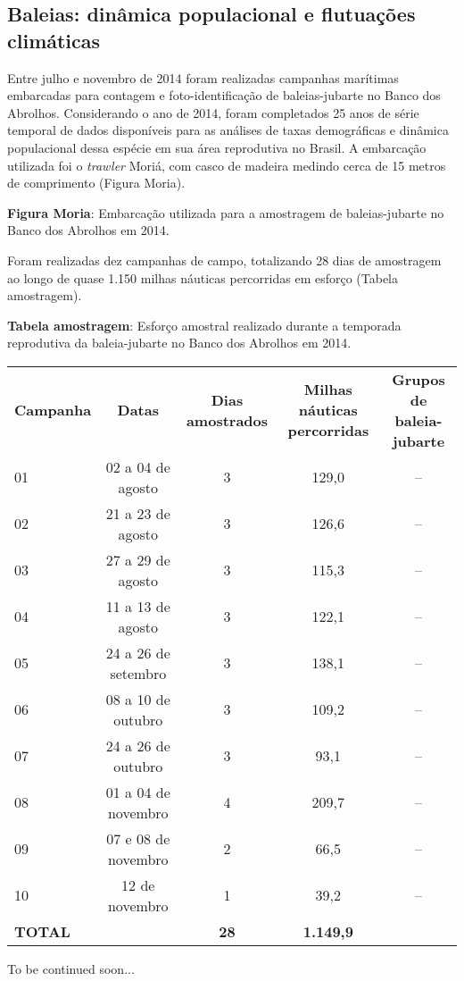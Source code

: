 \subsection{Baleias: dinâmica populacional e flutuações climáticas} %
\label{sec:dinam-popul-de} 

Entre julho e novembro de 2014 foram realizadas campanhas marítimas embarcadas para contagem e foto-identificação de baleias-jubarte no Banco dos Abrolhos. Considerando o ano de 2014, foram completados 25 anos de série temporal de dados disponíveis para as análises de taxas demográficas e dinâmica populacional dessa espécie em sua área reprodutiva no Brasil. A embarcação utilizada foi o \textit{trawler} Moriá, com casco de madeira medindo cerca de 15 metros de comprimento (Figura Moria).


\textbf{Figura Moria}: Embarcação utilizada para a amostragem de baleias-jubarte no Banco dos Abrolhos em 2014. 

Foram realizadas dez campanhas de campo, totalizando 28 dias de amostragem ao longo de quase 1.150 milhas náuticas percorridas em esforço (Tabela amostragem).

\textbf{Tabela amostragem}: Esforço amostral realizado durante a temporada reprodutiva da baleia-jubarte no Banco dos Abrolhos em 2014.

\begin{tabular}{lcccc}
  \textbf{Campanha}        & \textbf{Datas} & \textbf{Dias amostrados}  & \textbf{Milhas náuticas percorridas} &  \textbf{Grupos de baleia-jubarte} \\   
    01   & 02 a 04 de agosto   & 3   & 129,0   & --   \\            
    02   & 21 a 23 de agosto   & 3   & 126,6   & -- \\
    03   & 27 a 29 de agosto  &  3   & 115,3   & -- \\
    04   & 11 a 13 de agosto  & 3   & 122,1   &  --  \\
    05   & 24 a 26 de setembro  & 3   & 138,1   &  --  \\    
    06   & 08 a 10 de outubro  & 3   & 109,2   &  --  \\
    07   & 24 a 26 de outubro  & 3   & 93,1   &  --  \\
    08   & 01 a 04 de novembro  & 4   & 209,7   &  --  \\
    09   & 07 e 08 de novembro  & 2   & 66,5   &  --  \\
    10   & 12 de novembro  & 1   & 39,2   &  -- \\
    \textbf{TOTAL}   &   & \textbf{28}  & \textbf{1.149,9} &  \\ 
    
  \end{tabular}
  
  To be continued soon...